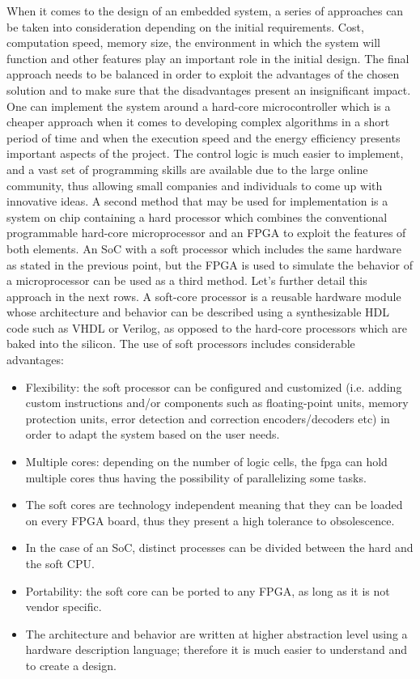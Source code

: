 \hspace{0.5cm} When it comes to the design of an embedded system, a series of approaches can be taken into
consideration depending on the initial requirements. Cost, computation speed, memory size,
the environment in which the system will function and other features play an important role
in the initial design. The final approach needs to be balanced in order to exploit the
advantages of the chosen solution and to make sure that the disadvantages present an
insignificant impact. One can implement the system around a hard-core microcontroller
which is a cheaper approach when it comes to developing complex algorithms in a short
period of time and when the execution speed and the energy efficiency presents important
aspects of the project. The control logic is much easier to implement, and a vast set of
programming skills are available due to the large online community, thus allowing small
companies and individuals to come up with innovative ideas. A second method that may be
used for implementation is a system on chip containing a hard processor which combines the
conventional programmable hard-core microprocessor and an FPGA to exploit the features of
both elements. An SoC with a soft processor which includes the same hardware as stated in
the previous point, but the FPGA is used to simulate the behavior of a microprocessor can be
used as a third method. Let’s further detail this approach in the next rows.
A soft-core processor is a reusable hardware module \cite{1} whose architecture and behavior can
be described using a synthesizable HDL code such as VHDL or Verilog, as opposed to the
hard-core processors which are baked into the silicon. The use of soft processors includes
considerable advantages:

\begin{itemize}
    \item Flexibility: the soft processor can be configured and customized (i.e. adding custom
instructions and/or components such as floating-point units, memory protection units,
error detection and correction encoders/decoders etc) in order to adapt the system
based on the user needs.
    \item Multiple cores: depending on the number of logic cells, the fpga can hold multiple
cores thus having the possibility of parallelizing some tasks.
    \item The soft cores are technology independent meaning that they can be loaded on every
FPGA board, thus they present a high tolerance to obsolescence.
    \item In the case of an SoC, distinct processes can be divided between the hard and the soft
CPU.
    \item Portability: the soft core can be ported to any FPGA, as long as it is not vendor
specific.
    \item The architecture and behavior are written at higher abstraction level using a hardware
description language; therefore it is much easier to understand and to create a design.
\end{itemize}

